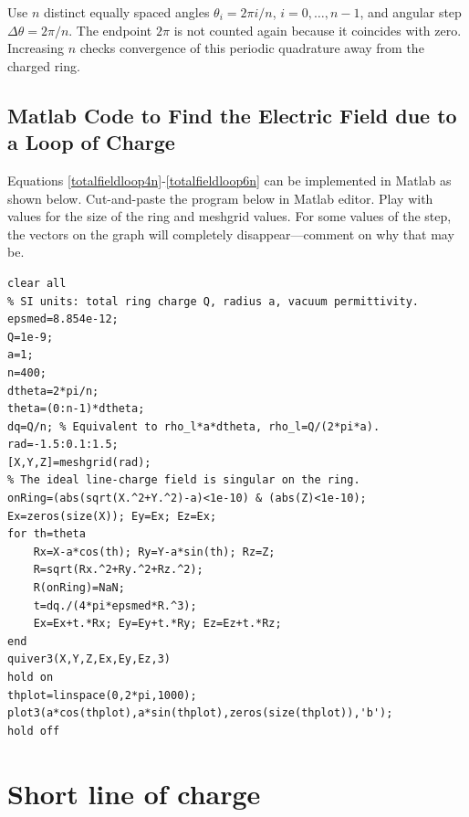 \documentclass{ximera}
\begin{document}
Use $n$ distinct equally spaced angles $\theta_i=2\pi i/n$, $i=0,\ldots,n-1$, and angular step $\Delta\theta=2\pi/n$. The endpoint $2\pi$ is not counted again because it coincides with zero. Increasing $n$ checks convergence of this periodic quadrature away from the charged ring.

\subsection{Matlab Code to Find the Electric Field due to a Loop of Charge }
 

Equations \ref{totalfieldloop4n}-\ref{totalfieldloop6n} can be implemented in Matlab as shown below. Cut-and-paste the program below in Matlab editor. Play with values for the size of the ring and meshgrid values. For some values of the step, the vectors on the graph will completely disappear—comment on why that may be.

\begin{verbatim}
clear all
% SI units: total ring charge Q, radius a, vacuum permittivity.
epsmed=8.854e-12;
Q=1e-9;
a=1;
n=400;
dtheta=2*pi/n;
theta=(0:n-1)*dtheta;
dq=Q/n; % Equivalent to rho_l*a*dtheta, rho_l=Q/(2*pi*a).
rad=-1.5:0.1:1.5;
[X,Y,Z]=meshgrid(rad);
% The ideal line-charge field is singular on the ring.
onRing=(abs(sqrt(X.^2+Y.^2)-a)<1e-10) & (abs(Z)<1e-10);
Ex=zeros(size(X)); Ey=Ex; Ez=Ex;
for th=theta
    Rx=X-a*cos(th); Ry=Y-a*sin(th); Rz=Z;
    R=sqrt(Rx.^2+Ry.^2+Rz.^2);
    R(onRing)=NaN;
    t=dq./(4*pi*epsmed*R.^3);
    Ex=Ex+t.*Rx; Ey=Ey+t.*Ry; Ez=Ez+t.*Rz;
end
quiver3(X,Y,Z,Ex,Ey,Ez,3)
hold on
thplot=linspace(0,2*pi,1000);
plot3(a*cos(thplot),a*sin(thplot),zeros(size(thplot)),'b');
hold off
\end{verbatim}


\section{Short line of charge}
\end{document}
